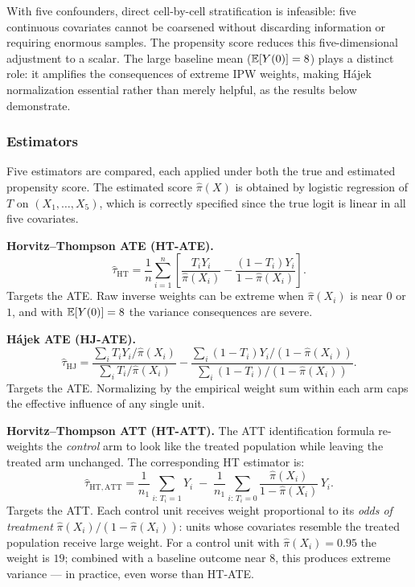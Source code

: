 \documentclass[master.tex]{subfiles}
\begin{document}
With five confounders, direct cell-by-cell stratification is infeasible:
five continuous covariates cannot be coarsened without discarding
information or requiring enormous samples.  The propensity score reduces
this five-dimensional adjustment to a scalar.  The large baseline mean
($\mathbb{E}[Y(0)] = 8$) plays a distinct role: it amplifies the consequences
of extreme IPW weights, making Hájek normalization essential rather
than merely helpful, as the results below demonstrate.

\subsubsection*{Estimators}

Five estimators are compared, each applied under both the true and
estimated propensity score.  The estimated score $\hat\pi(X)$ is
obtained by logistic regression of $T$ on $(X_1, \ldots, X_5)$, which
is correctly specified since the true logit is linear in all five
covariates.

\medskip\noindent\textbf{Horvitz--Thompson ATE (HT-ATE).}
\[
  \hat\tau_{\mathrm{HT}}
  = \frac{1}{n}\sum_{i=1}^n
    \left[\frac{T_i Y_i}{\hat\pi(X_i)}
        - \frac{(1-T_i)Y_i}{1-\hat\pi(X_i)}\right].
\]
Targets the ATE.  Raw inverse weights can be extreme when $\hat\pi(X_i)$
is near $0$ or $1$, and with $\mathbb{E}[Y(0)]=8$ the variance consequences are
severe.

\medskip\noindent\textbf{Hájek ATE (HJ-ATE).}
\[
  \hat\tau_{\mathrm{HJ}}
  = \frac{\displaystyle\sum_i T_i Y_i / \hat\pi(X_i)}
         {\displaystyle\sum_i T_i   / \hat\pi(X_i)}
  - \frac{\displaystyle\sum_i (1-T_i)Y_i / (1-\hat\pi(X_i))}
         {\displaystyle\sum_i (1-T_i)   / (1-\hat\pi(X_i))}.
\]
Targets the ATE.  Normalizing by the empirical weight sum within each
arm caps the effective influence of any single unit.

\medskip\noindent\textbf{Horvitz--Thompson ATT (HT-ATT).}
The ATT identification formula re-weights the \emph{control} arm to
look like the treated population while leaving the treated arm
unchanged.  The corresponding HT estimator is:
\[
  \hat\tau_{\mathrm{HT,ATT}}
  = \frac{1}{n_1}\sum_{i:\,T_i=1} Y_i
  \;-\;
  \frac{1}{n_1}\sum_{i:\,T_i=0}
    \frac{\hat\pi(X_i)}{1-\hat\pi(X_i)}\,Y_i.
\]
Targets the ATT.  Each control unit receives weight proportional to
its \emph{odds of treatment} $\hat\pi(X_i)/(1-\hat\pi(X_i))$: units
whose covariates resemble the treated population receive large weight.
For a control unit with $\hat\pi(X_i) = 0.95$ the weight is $19$;
combined with a baseline outcome near $8$, this produces extreme
variance --- in practice, even worse than HT-ATE.
\end{document}
